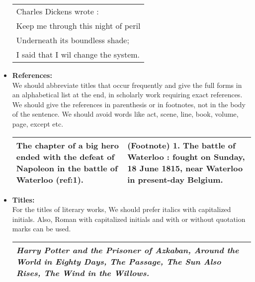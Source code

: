 \documentclass{report}
\begin{document}
\begin{itemize}
        \begin{center}
        \begin{tabular}{|C{6cm}|}
         \hline
         Charles Dickens wrote :
         \\Keep me through this night of peril
         \\Underneath its boundless shade;\\\hline
         I said that I wil change the system.\\\hline
        \end{tabular}
        \end{center}
        \bigskip
    
      \item
       \textbf{\Large{References:}}\\
        We should abbreviate titles that occur frequently and give the full forms in an alphabetical list at the end, in scholarly work requiring exact references. We should give the references in parenthesis or in footnotes, not in the body of the sentence. We should avoid words like act, scene, line, book, volume, page, except etc.
        
        \begin{center}
        \begin{tabular}{|C{5.5cm}|C{5.5cm}|}
         \hline
         The chapter of a big hero ended with the defeat
         of Napoleon in the battle of Waterloo (ref:1).
         & (Footnote) 1. The battle of Waterloo : fought on Sunday, 18 June 1815,
         near Waterloo in present-day Belgium.\\\hline
        \end{tabular}
        \end{center}
        \bigskip
        
       \item
        \textbf{\Large{Titles:}}\\
        For the titles of literary works, We should prefer italics with capitalized initials.
        Also, Roman with capitalized initials and with or without quotation marks can be used.
    
        \begin{center}
        \begin{tabular}{|C{6cm}|}
         \hline
         \textit{Harry Potter and the Prisoner of Azkaban, Around the World in Eighty Days,
         The Passage, The Sun Also Rises, The Wind in the Willows.}\\\hline
        \end{tabular}
        \end{center}
        
        \newpage    
    \end{itemize}
    
\end{document}
